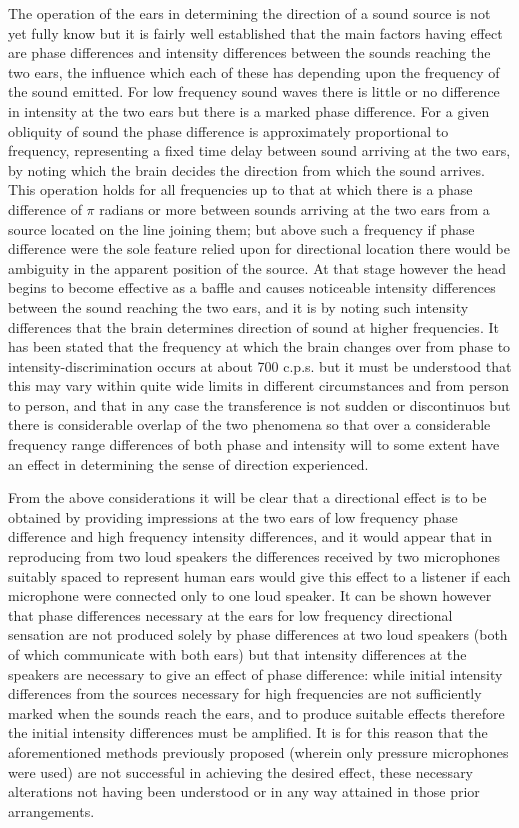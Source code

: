 \documentclass[11pt]{article}
\begin{document}
\begin{multicols*}{2}
The operation of the ears in determining the direction of a sound source is not yet fully know but it is fairly well established that the main factors having effect are phase differences and intensity differences between the sounds reaching the two ears, the influence which each of these has depending upon the frequency of the sound emitted. For low frequency sound waves there is little or no difference in intensity at the two ears but there is a marked phase difference. For a given obliquity of sound the phase difference is approximately proportional to frequency, representing a fixed time delay between sound arriving at the two ears, by noting which the brain decides the direction from which the sound arrives. This operation holds for all frequencies up to that at which there is a phase difference of $\pi$ radians or more between sounds arriving at the two ears from a source located on the line joining them; but above such a frequency if phase difference were the sole feature relied upon for directional location there would be ambiguity in the apparent position of the source. At that stage however the head begins to become effective as a baffle and causes noticeable intensity differences between the sound reaching the two ears, and it is by noting such intensity differences that the brain determines direction of sound at higher frequencies. It has been stated that the frequency at which the brain changes over from phase to intensity-discrimination occurs at about 700 c.p.s. but it must be understood that this may vary within quite wide limits in different circumstances and from person to person, and that in any case the transference is not sudden or discontinuos but there is considerable overlap of the two phenomena so that over a considerable frequency range differences of both phase and intensity will to some extent have an effect in determining the sense of direction experienced. 
	
From the above considerations it will be clear that a directional effect is to be obtained by providing impressions at the two ears of low frequency phase difference and high frequency intensity differences, and it would appear that in reproducing from two loud speakers the differences received by two microphones suitably spaced to represent human ears would give this effect to a listener if each microphone were connected only to one loud speaker. It can be shown however that phase differences necessary at the ears for low frequency directional sensation are not produced solely by phase differences at two loud speakers (both of which communicate with both ears) but that intensity differences at the speakers are necessary to give an effect of phase difference: while initial intensity differences from the sources necessary for high frequencies are not sufficiently marked when the sounds reach the ears, and to produce suitable effects therefore the initial intensity differences must be amplified. It is for this reason that the aforementioned methods previously proposed (wherein only pressure microphones were used) are not successful in achieving the desired effect, these necessary alterations not having been understood or in any way attained in those prior arrangements.


\end{multicols*}
\end{document}
